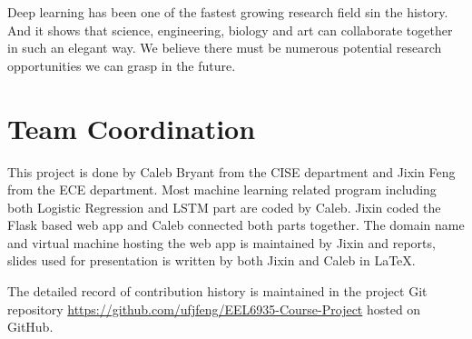 \documentclass[conference]{IEEEtran}
\begin{document}
    Deep learning has been one of the fastest growing research field sin the history.
    And it shows that science, engineering, biology and art can collaborate together
    in such an elegant way. We believe there must be numerous potential research opportunities
    we can grasp in the future.


\section{Team Coordination}
\label{team}
    This project is done by Caleb Bryant from the CISE department and Jixin Feng from the ECE
    department. Most machine learning related program including both Logistic
    Regression and LSTM part are coded by Caleb. Jixin coded the Flask based web app
    and Caleb connected both parts together. The domain name and virtual machine hosting
    the web app is maintained by Jixin and reports, slides used for presentation
    is written by both Jixin and Caleb in \LaTeX.

    The detailed record of contribution history is maintained in the project Git repository
    \url{https://github.com/ufjfeng/EEL6935-Course-Project} hosted on GitHub.




\end{document}
